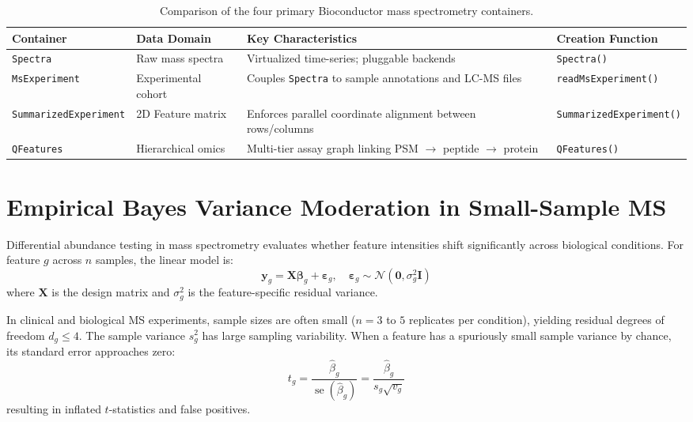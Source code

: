 \documentclass[11pt,twoside,openright]{book}
\begin{document}
\begin{table}[htbp]
\centering
\caption{Comparison of the four primary Bioconductor mass spectrometry containers.}
\label{tab:four_containers}
\small
\begin{tabularx}{\textwidth}{>{\raggedright\arraybackslash}p{3.4cm} >{\raggedright\arraybackslash}p{2.6cm} >{\raggedright\arraybackslash}X >{\raggedright\arraybackslash}l}
\toprule
\textbf{Container} & \textbf{Data Domain} & \textbf{Key Characteristics} & \textbf{Creation Function} \\
\midrule
\texttt{Spectra} & Raw mass spectra & Virtualized time-series; pluggable backends & \texttt{Spectra()} \\
\addlinespace
\texttt{MsExperiment} & Experimental cohort & Couples \texttt{Spectra} to sample annotations and LC-MS files & \texttt{readMsExperiment()} \\
\addlinespace
\texttt{SummarizedExperiment} & 2D Feature matrix & Enforces parallel coordinate alignment between rows/columns & \texttt{SummarizedExperiment()} \\
\addlinespace
\texttt{QFeatures} & Hierarchical omics & Multi-tier assay graph linking PSM $\to$ peptide $\to$ protein & \texttt{QFeatures()} \\
\bottomrule
\end{tabularx}
\end{table}

\FloatBarrier
\section{Empirical Bayes Variance Moderation in Small-Sample MS}
\label{sec:limma_eb}

Differential abundance testing in mass spectrometry evaluates whether feature intensities shift significantly across biological conditions. For feature $g$ across $n$ samples, the linear model is:
\begin{equation}
\mathbf{y}_g = \mathbf{X} \boldsymbol{\beta}_g + \boldsymbol{\varepsilon}_g, \quad \boldsymbol{\varepsilon}_g \sim \mathcal{N}(\mathbf{0}, \sigma_g^2 \mathbf{I})
\label{eq:linear_model}
\end{equation}
where $\mathbf{X}$ is the design matrix and $\sigma_g^2$ is the feature-specific residual variance.

In clinical and biological MS experiments, sample sizes are often small ($n = 3$ to $5$ replicates per condition), yielding residual degrees of freedom $d_g \le 4$. The sample variance $s_g^2$ has large sampling variability. When a feature has a spuriously small sample variance by chance, its standard error approaches zero:
\begin{equation}
t_g = \frac{\hat{\beta}_g}{\operatorname{se}(\hat{\beta}_g)} = \frac{\hat{\beta}_g}{s_g \sqrt{v_g}}
\label{eq:standard_t}
\end{equation}
resulting in inflated $t$-statistics and false positives.
\end{document}
